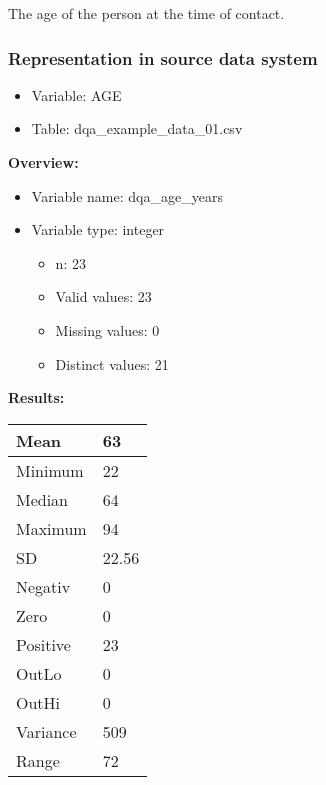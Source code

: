 \documentclass[
]{article}
\providecommand{\tightlist}{%
  \setlength{\itemsep}{0pt}\setlength{\parskip}{0pt}}
\begin{document}
The age of the person at the time of contact.

\hypertarget{representation-in-source-data-system}{%
\subsubsection{\texorpdfstring{Representation in \textbf{source} data
system}{Representation in source data system}}\label{representation-in-source-data-system}}

\begin{itemize}
\tightlist
\item
  Variable: AGE
\item
  Table: dqa\_example\_data\_01.csv
\end{itemize}

\textbf{Overview:}

\begin{itemize}
\tightlist
\item
  Variable name: dqa\_age\_years
\item
  Variable type: integer

  \begin{itemize}
  \tightlist
  \item
    n: 23
  \item
    Valid values: 23
  \item
    Missing values: 0
  \item
    Distinct values: 21
  \end{itemize}
\end{itemize}

\textbf{Results:}\\

\begin{table}[H]
\centering
\begin{tabular}{l|l}
\hline
Mean & 63\\
\hline
Minimum & 22\\
\hline
Median & 64\\
\hline
Maximum & 94\\
\hline
SD & 22.56\\
\hline
Negativ & 0\\
\hline
Zero & 0\\
\hline
Positive & 23\\
\hline
OutLo & 0\\
\hline
OutHi & 0\\
\hline
Variance & 509\\
\hline
Range & 72\\
\hline
\end{tabular}
\end{table}
\end{document}

